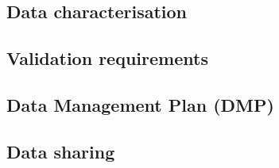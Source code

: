 \documentclass[12pt, a4paper]{article}
\begin{document}
\subsection{Data characterisation}
\subsection{Validation requirements}
\subsection{Data Management Plan (DMP)}
\subsection{Data sharing}
\end{document}
